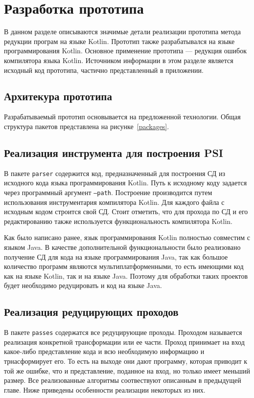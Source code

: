 \chapter{Разработка прототипа}
В данном разделе описываются значимые детали реализации прототипа метода редукции програм на языке Kotlin. Прототип также разрабатывался на языке программирования Kotlin. Основное применение прототипа --- редукция ошибок компилятора языка Kotlin. Источником информации в этом разделе является исходный код прототипа, частично представленный в приложении.
\section{Архитекура прототипа}
Разрабатываемый прототип основывается на предложенной технологии. Общая структура пакетов представлена на рисунке~\ref{packages}.

\section{Реализация инструмента для построения PSI}
В пакете \texttt{parser} содержится код, предназначенный для построения СД из исходного кода языка программирования Kotlin. Путь к исходному коду задается через программный аргумент \texttt{--path}. Построение производится путем использования инструментария компилятора Kotlin. Для каждого файла с исходным кодом строится свой СД. Стоит отметить, что для прохода по СД и его редактированию также используется функциональность компилятора Kotlin.

Как было написано ранее, язык программирования Kotlin полностью совместим с языком Java. В качестве дополнительной функциональности было реализовано получение СД для кода на языке программирования Java, так как большое количество программ являются мультиплатформенными, то есть имеющими код как на языке Kotlin, так и на языке Java. Поэтому для обработки таких проектов будет необходимо редуцировать и код на языке Java. 

\section{Реализация редуцирующих проходов}
В пакете \texttt{passes} содержатся все редуцирующие проходы. Проходом называется реализация конкретной трансформации или ее части. Проход принимает на вход какое-либо представление кода и всю необходимую информацию и трнасформирует его. То есть на выходе они дают программу, которая приводит к той же ошибке, что и представление, поданное на вход, но только имеет меньший размер. Все реализованные алгоритмы соотвествуют описанным в предыдущей главе. Ниже приведены особенности реализации некоторых из них.

